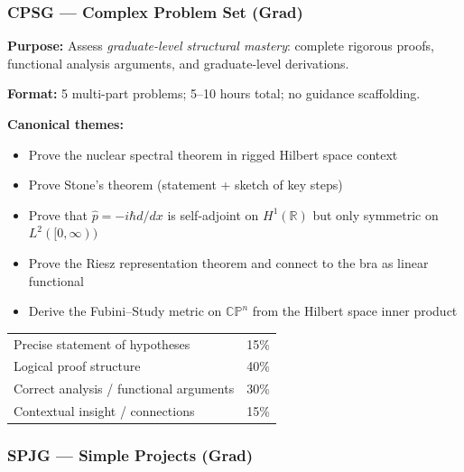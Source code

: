 \documentclass[11pt,a4paper]{article}
\begin{document}
\bigskip
\subsubsection{CPSG --- Complex Problem Set (Grad)}

\begin{tcolorbox}[gradprobbox, title={CPSG --- Complex Problem Set, Graduate \hfill\normalfont 5 problems}]

\textbf{Purpose:} Assess \emph{graduate-level structural mastery}: complete rigorous
proofs, functional analysis arguments, and graduate-level derivations.

\medskip\textbf{Format:} 5 multi-part problems; 5--10 hours total; no guidance scaffolding.

\medskip\textbf{Canonical themes:}
\begin{itemize}[leftmargin=1.5em,itemsep=2pt]
  \item Prove the nuclear spectral theorem in rigged Hilbert space context
  \item Prove Stone's theorem (statement + sketch of key steps)
  \item Prove that $\hat{p}=-i\hbar d/dx$ is self-adjoint on $H^1(\mathbb{R})$
        but only symmetric on $L^2([0,\infty))$
  \item Prove the Riesz representation theorem and connect to the bra as linear functional
  \item Derive the Fubini--Study metric on $\mathbb{CP}^n$ from the Hilbert space
        inner product
\end{itemize}
\end{tcolorbox}

\begin{tcolorbox}[rubricbox, title={CPSG Rubric (per problem)}]
\begin{tabular}{ll}
  Precise statement of hypotheses         & 15\%\\
  Logical proof structure                 & 40\%\\
  Correct analysis / functional arguments & 30\%\\
  Contextual insight / connections        & 15\%\\
\end{tabular}
\end{tcolorbox}

\bigskip
\subsubsection{SPJG --- Simple Projects (Grad)}
\end{document}
